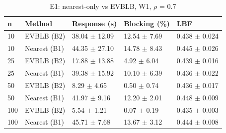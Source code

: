 \begin{table}[t]
\centering
\footnotesize
\caption{E1: nearest-only vs EVBLB, W1, $\rho$ = 0.7}
\label{tab:e1}
\begin{tabular}{lllll}
\toprule
n & Method & Response (s) & Blocking (\%) & LBF \\
\midrule
10 & EVBLB (B2) & 38.04 $\pm$ 12.09 & 12.54 $\pm$ 7.69 & 0.438 $\pm$ 0.024 \\
10 & Nearest (B1) & 44.35 $\pm$ 27.10 & 14.78 $\pm$ 8.43 & 0.445 $\pm$ 0.026 \\
25 & EVBLB (B2) & 17.88 $\pm$ 13.88 & 4.92 $\pm$ 6.04 & 0.439 $\pm$ 0.016 \\
25 & Nearest (B1) & 39.38 $\pm$ 15.92 & 10.10 $\pm$ 6.39 & 0.436 $\pm$ 0.022 \\
50 & EVBLB (B2) & 8.29 $\pm$ 4.65 & 0.50 $\pm$ 0.74 & 0.436 $\pm$ 0.017 \\
50 & Nearest (B1) & 41.97 $\pm$ 9.16 & 12.20 $\pm$ 2.01 & 0.448 $\pm$ 0.009 \\
100 & EVBLB (B2) & 5.54 $\pm$ 1.21 & 0.07 $\pm$ 0.19 & 0.435 $\pm$ 0.003 \\
100 & Nearest (B1) & 45.71 $\pm$ 7.68 & 13.67 $\pm$ 3.12 & 0.444 $\pm$ 0.008 \\
\bottomrule
\end{tabular}
\end{table}
